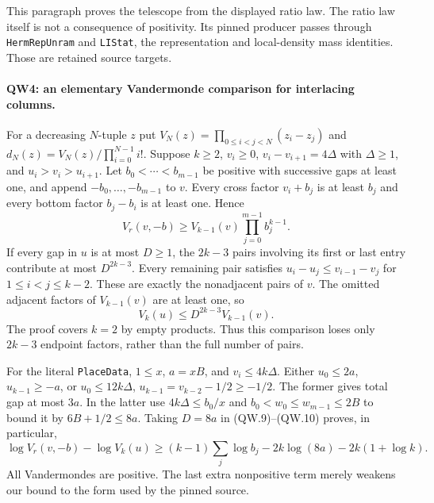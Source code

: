 This paragraph proves the telescope from the displayed ratio law. The
ratio law itself is not a consequence of positivity. Its pinned
producer passes through \texttt{HermRepUnram} and \texttt{LIStat},
the representation and local-density mass identities. Those are
retained source targets.

\paragraph{QW4: an elementary Vandermonde comparison for interlacing columns.}
For a decreasing $N$-tuple $z$ put
$V_N(z)=\prod_{0\le i<j<N}(z_i-z_j)$ and
$d_N(z)=V_N(z)/\prod_{i=0}^{N-1}i!$.
Suppose $k\ge2$, $v_i\ge0$, $v_i-v_{i+1}=4\Delta$ with
$\Delta\ge1$, and
$u_i>v_i>u_{i+1}$. Let $b_0<\cdots<b_{m-1}$ be positive with
successive gaps at least one, and append $-b_0,\ldots,-b_{m-1}$ to $v$.
Every cross factor $v_i+b_j$ is at least $b_j$ and every bottom factor
$b_j-b_i$ is at least one. Hence
\[
 V_r(v,-b)\ge V_{k-1}(v)\prod_{j=0}^{m-1}b_j^{k-1}.             \tag{QW.9}
\]
If every gap in $u$ is at most $D\ge1$, the $2k-3$ pairs involving
its first or last entry contribute at most $D^{2k-3}$. Every remaining
pair satisfies
$u_i-u_j\le v_{i-1}-v_j$ for $1\le i<j\le k-2$.
These are exactly the nonadjacent pairs of $v$. The omitted adjacent
factors of $V_{k-1}(v)$ are at least one, so
\[
                      V_k(u)\le D^{2k-3}V_{k-1}(v).             \tag{QW.10}
\]
The proof covers $k=2$ by empty products. Thus this comparison loses
only $2k-3$ endpoint factors, rather than the full number of pairs.

For the literal \texttt{PlaceData}, $1\le x$, $a=xB$, and
$v_i\le4k\Delta$. Either $u_0\le2a$, $u_{k-1}\ge-a$, or
$u_0\le12k\Delta$, $u_{k-1}=v_{k-2}-1/2\ge-1/2$.
The former gives total gap at most $3a$. In the latter use
$4k\Delta\le b_0/x$ and $b_0<w_0\le w_{m-1}\le2B$ to bound it by
$6B+1/2\le8a$. Taking $D=8a$ in (QW.9)--(QW.10) proves, in particular,
\[
 \log V_r(v,-b)-\log V_k(u)
 \ge(k-1)\sum_j\log b_j-2k\log(8a)-2k(1+\log k).              \tag{QW.11}
\]
All Vandermondes are positive. The last extra nonpositive term merely
weakens our bound to the form used by the pinned source.

